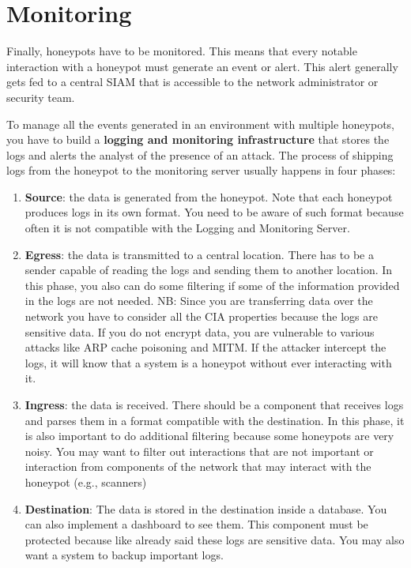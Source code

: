 \documentclass[epsfig,a4paper,11pt,titlepage,oneside,openany]{book}
\begin{document}
\section{Monitoring}

Finally, honeypots have to be monitored. This means that every notable interaction with a honeypot must generate an event or alert. This alert generally gets fed to a central SIAM that is accessible to the network administrator or security team.

To manage all the events generated in an environment with multiple honeypots, you have to build a \textbf{logging and monitoring infrastructure} that stores the logs and alerts the analyst of the presence of an attack. The process of shipping logs from the honeypot to the monitoring server usually happens in four phases:
\begin{enumerate}
\item \textbf{Source}: the data is generated from the honeypot. Note that each honeypot produces logs in its own format. You need to be aware of such format because often it is not compatible with the Logging and Monitoring Server.
\item \textbf{Egress}: the data is transmitted to a central location. There has to be a sender capable of reading the logs and sending them to another location. In this phase, you also can do some filtering  if some of the information provided in the logs are not needed. 
NB: Since you are transferring data over the network you have to consider all the CIA properties because the logs are sensitive data. If you do not encrypt data, you are vulnerable to various attacks like ARP cache poisoning and MITM. If the attacker intercept the logs, it will know that a system is a honeypot without ever interacting with it.

\item	\textbf{Ingress}: the data is received. There should be a component that receives logs and parses them in a format compatible with the destination. In this phase, it is also important to do additional filtering because  some honeypots are very noisy. You may want to filter out interactions that are not important or interaction from components of the network that may interact with the honeypot (e.g., scanners)
\item \textbf{Destination}: The data is stored in the destination inside a database.  You can also implement a dashboard to see them. This component must be protected because like already said these logs are sensitive data. You may also want a system to backup important logs.
\end{enumerate}
\end{document}
